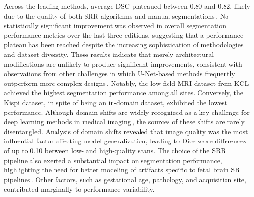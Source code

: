 Across the leading methods, average DSC plateaued between 0.80 and 0.82, likely due to the quality of both SRR algorithms and manual segmentations\,\cite{FeTA2022_review}. No statistically significant improvement was observed in overall segmentation performance metrics over the last three editions, suggesting that a performance plateau has been reached despite the increasing sophistication of methodologies and dataset diversity. These results indicate that merely architectural modifications are unlikely to produce significant improvements, consistent with observations from other challenges in which U-Net-based methods frequently outperform more complex designs\,\cite{Eisenmann2023, FeTA2024_review}. Notably, the low-field MRI dataset from KCL achieved the highest segmentation performance among all sites. Conversely, the Kispi dataset, in spite of being an in-domain dataset, exhibited the lowest performance. Although domain shifts are widely recognized as a key challenge for deep learning methods in medical imaging\,\cite{Dockes2021}, the sources of these shifts are rarely disentangled. Analysis of domain shifts revealed that image quality was the most influential factor affecting model generalization, leading to Dice score differences of up to 0.10 between low- and high-quality scans. The choice of the SRR pipeline also exerted a substantial impact on segmentation performance, highlighting the need for better modeling of artifacts specific to fetal brain SR pipelines\,\cite{Sanchez2024}. Other factors, such as gestational age, pathology, and acquisition site, contributed marginally to performance variability.

